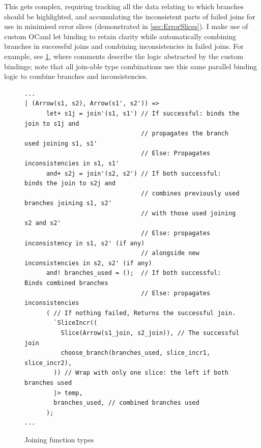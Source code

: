 This gets complex, requiring tracking all the data relating to which branches should be highlighted, and accumulating the inconsistent parts of failed joins for use in minimised error slices (demonstrated in \cref{sec:ErrorSlices}). I make use of custom OCaml let binding \cite{CustomLetOperators} to retain clarity while automatically combining branches in successful joins and combining inconsistencies in failed joins. For example, see \cref{fig:ArrowJoin}, where comments describe the logic abstracted by the custom bindings; note that all join-able type combinations use this same parallel binding logic to combine branches and inconsistencies.

\begin{figure}[h]
\small
\begin{verbatim}
...
| (Arrow(s1, s2), Arrow(s1', s2')) =>
      let+ s1j = join'(s1, s1') // If successful: binds the join to s1j and
                                // propagates the branch used joining s1, s1'
                                // Else: Propagates inconsistencies in s1, s1'
      and+ s2j = join'(s2, s2') // If both successful: binds the join to s2j and
                                // combines previously used branches joining s1, s2' 
                                // with those used joining s2 and s2'
                                // Else: propagates inconsistency in s1, s2' (if any)
                                // alongside new inconsistencies in s2, s2' (if any)
      and! branches_used = ();  // If both successful: Binds combined branches
                                // Else: propagates inconsistencies
      ( // If nothing failed, Returns the successful join.
        `SliceIncr((
          Slice(Arrow(s1_join, s2_join)), // The successful join
          choose_branch(branches_used, slice_incr1, slice_incr2),
        )) // Wrap with only one slice: the left if both branches used
        |> temp,
        branches_used, // combined branches used
      );
...
\end{verbatim}
\caption{Joining function types}
\label{fig:ArrowJoin}
\end{figure}

